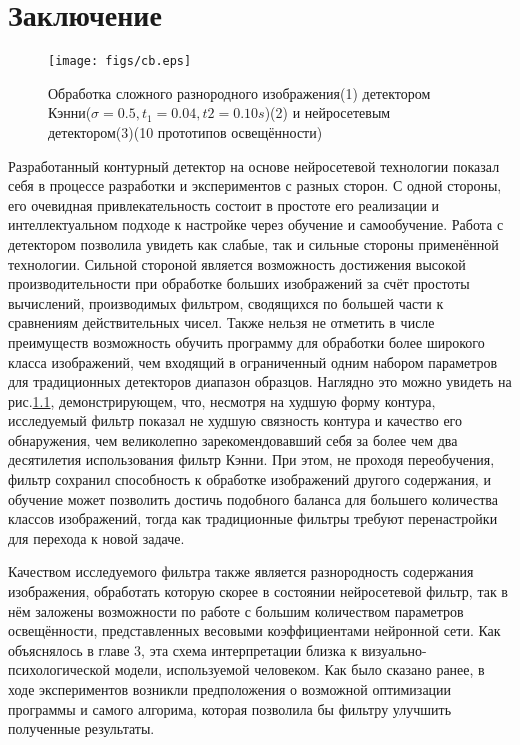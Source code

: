 \documentclass[a4paper,12pt]{report}
\begin{document}
\chapter{Заключение}
\begin{center}
\begin{figure}[h]
\begin{center}
\texttt{[image: figs/cb.eps]}
\end{center}\caption{Обработка сложного разнородного изображения(1) детектором Кэнни($\sigma=0.5, t_1=0.04, t2=0.10s$)(2) и нейросетевым детектором(3)(10 прототипов освещённости) }
\label{last}
\end{figure}
\end{center}
Разработанный контурный детектор на основе нейросетевой технологии показал себя в процессе разработки и экспериментов с разных сторон. С одной стороны, его очевидная привлекательность состоит в простоте его реализации и интеллектуальном подходе к настройке через обучение и самообучение. Работа с детектором позволила увидеть как слабые, так и сильные стороны применённой технологии. Сильной стороной является возможность достижения высокой производительности при обработке больших изображений за счёт простоты вычислений, производимых фильтром, сводящихся по большей части к сравнениям действительных чисел. Также нельзя не отметить в числе преимуществ возможность обучить программу для обработки более широкого класса изображений, чем входящий в ограниченный одним набором параметров для традиционных детекторов диапазон образцов. Наглядно это можно увидеть на рис.\ref{last}, демонстрирующем, что, несмотря на худшую форму контура, исследуемый фильтр показал не худшую связность контура и качество его обнаружения, чем великолепно зарекомендовавший себя за более чем два десятилетия использования фильтр Кэнни. При этом, не проходя переобучения, фильтр сохранил способность к обработке изображений другого содержания, и обучение может позволить достичь подобного баланса для большего количества классов изображений, тогда как традиционные фильтры требуют перенастройки для перехода к новой задаче.

Качеством исследуемого фильтра также является разнородность содержания изображения, обработать которую скорее в состоянии нейросетевой фильтр, так в нём заложены возможности по работе с большим количеством параметров освещённости, представленных весовыми коэффициентами нейронной сети. Как объяснялось в главе 3, эта схема интерпретации близка к визуально-психологической модели, используемой человеком. Как было сказано ранее, в ходе экспериментов возникли предположения о возможной оптимизации программы и самого алгорима, которая позволила бы фильтру улучшить полученные результаты.
\end{document}
